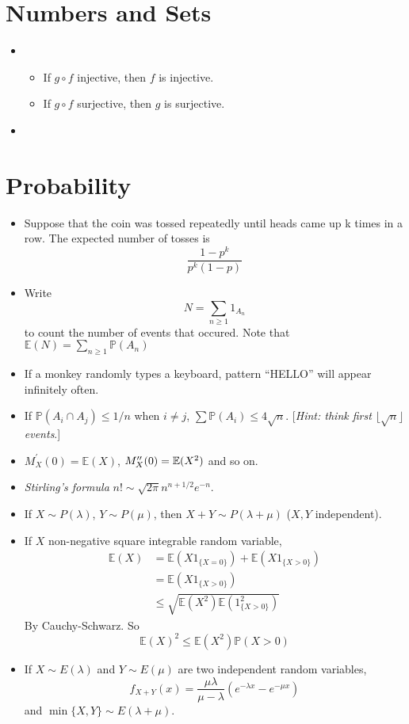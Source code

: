 \documentclass[10pt, a4paper, twoside]{report}
\begin{document}
    \section{Numbers and Sets}
    \begin{itemize}
        \item \begin{itemize}
            \item If \(g\circ f\) injective, then \(f\) is injective.
            \item If \(g\circ f\) surjective, then \(g\) is surjective.
        \end{itemize}
        \item 
    \end{itemize}
    \section{Probability}
    \begin{itemize}
        \item Suppose that the coin was tossed repeatedly until heads came up k times in a row. The expected number of tosses is 
        \[\frac{1-p^k}{p^k(1-p)}\]
        \item Write 
        \[N=\sum_{n\geq 1}1_{A_n}\]
        to count the number of events that occured.
        Note that \(\mathbb{E}(N)=\sum_{n\geq 1}\mathbb{P}(A_n)\)
        \item If a monkey randomly types a keyboard, pattern ``HELLO'' will appear infinitely often.
        \item If \(\mathbb{P}(A_i\cap A_j)\leq 1/n\) when \(i\neq j\), \(\sum\mathbb{P}(A_i)\leq 4\sqrt{n}\). [\emph{Hint: think first \(\lfloor{\sqrt{n}}\rfloor\) events}.]
        \item \(M_X^\prime(0)=\mathbb{E}(X)\), \(M_X^{\prime\prime}(0)=\mathbb{E}(X^2)\) and so on.
        \item \emph{Stirling's formula} \(n!\sim\sqrt{2\pi}n^{n+1/2}e^{-n}\).
        \item If \(X\sim P(\lambda)\), \(Y\sim P(\mu)\), then \(X+Y\sim P(\lambda+\mu)\) (\(X,Y\) independent).
        \item If \(X\) non-negative square integrable random variable,
        \begin{align*}
            \mathbb{E}(X)&=\mathbb{E}(X1_{\{X=0\}})+\mathbb{E}(X1_{\{X>0\}}) \\
            &=\mathbb{E}(X1_{\{X>0\}}) \\
            &\leq\sqrt{\mathbb{E}(X^2)\mathbb{E}(1^2_{\{X>0\}})}
        \end{align*}
        By Cauchy-Schwarz. So 
        \[\mathbb{E}(X)^2\leq\mathbb{E}(X^2)\mathbb{P}(X>0)\]
        \item If \(X\sim E(\lambda)\) and \(Y\sim E(\mu)\) are two independent random variables,
        \[f_{X+Y}(x)=\frac{\mu\lambda}{\mu-\lambda}(e^{-\lambda x}-e^{-\mu x})\]
        and \(\min\{X,Y\}\sim E(\lambda+\mu)\).
    \end{itemize}
\end{document}
